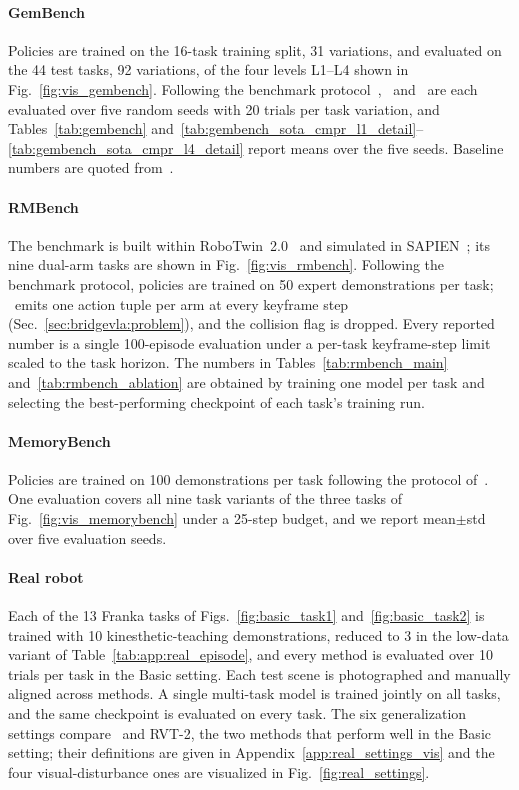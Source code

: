 \paragraph{GemBench}
Policies are trained on the 16-task training split, 31 variations, and
evaluated on the 44 test tasks, 92 variations, of the four levels
L1--L4 shown in Fig.~\ref{fig:vis_gembench}.
Following the benchmark protocol~\cite{garcia2024towards}, \method\ and
\memmethod\ are each evaluated over five random seeds with 20 trials
per task variation, and Tables~\ref{tab:gembench}
and~\ref{tab:gembench_sota_cmpr_l1_detail}--\ref{tab:gembench_sota_cmpr_l4_detail}
report means over the five seeds.
Baseline numbers are quoted from~\cite{garcia2024towards}.

\paragraph{RMBench}
The benchmark is built within RoboTwin~2.0~\cite{chen2025robotwin2} and
simulated in SAPIEN~\cite{xiang2020sapien}; its nine dual-arm tasks are
shown in Fig.~\ref{fig:vis_rmbench}.
Following the benchmark protocol, policies are trained on 50 expert
demonstrations per task; \memmethod\ emits one action tuple per arm at
every keyframe step (Sec.~\ref{sec:bridgevla:problem}), and the
collision flag is dropped.
Every reported number is a single 100-episode evaluation under a
per-task keyframe-step limit scaled to the task horizon.
The numbers in Tables~\ref{tab:rmbench_main}
and~\ref{tab:rmbench_ablation} are obtained by training one model per
task and selecting the best-performing checkpoint of each task's training run.

\paragraph{MemoryBench}
Policies are trained on 100 demonstrations per task following the
protocol of~\cite{fang2025sam2act}.
One evaluation covers all nine task variants of the three tasks of
Fig.~\ref{fig:vis_memorybench} under a 25-step budget, and we report mean$\pm$std over five evaluation seeds.

\paragraph{Real robot}
Each of the 13 Franka tasks of Figs.~\ref{fig:basic_task1}
and~\ref{fig:basic_task2} is trained with 10 kinesthetic-teaching
demonstrations, reduced to 3 in the low-data variant of
Table~\ref{tab:app:real_episode}, and every method is evaluated over 10
trials per task in the Basic setting.
Each test scene is photographed and manually aligned across methods.
A single multi-task model is trained jointly on all tasks, and the
same checkpoint is evaluated on every task.
The six generalization settings compare \method\ and RVT-2, the two
methods that perform well in the Basic setting; their definitions are
given in Appendix~\ref{app:real_settings_vis} and the four
visual-disturbance ones are visualized in Fig.~\ref{fig:real_settings}.


